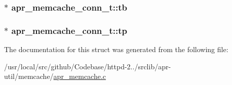 \subsubsection[{\texorpdfstring{tb}{tb}}]{$\ast$ apr\+\_\+memcache\+\_\+conn\+\_\+t\+::tb}\hypertarget{structapr__memcache__conn__t_a59e38bb57276556217931c4abd0b79be}{}\label{structapr__memcache__conn__t_a59e38bb57276556217931c4abd0b79be}
\subsubsection[{\texorpdfstring{tp}{tp}}]{$\ast$ apr\+\_\+memcache\+\_\+conn\+\_\+t\+::tp}\hypertarget{structapr__memcache__conn__t_a2f7e24fb93ad04b8e42f547577e76d7c}{}\label{structapr__memcache__conn__t_a2f7e24fb93ad04b8e42f547577e76d7c}


The documentation for this struct was generated from the following file\+:\begin{DoxyCompactItemize}
\item 
/usr/local/src/github/\+Codebase/httpd-\/2../srclib/apr-\/util/memcache/\hyperlink{apr__memcache_8c}{apr\+\_\+memcache.\+c}\end{DoxyCompactItemize}
